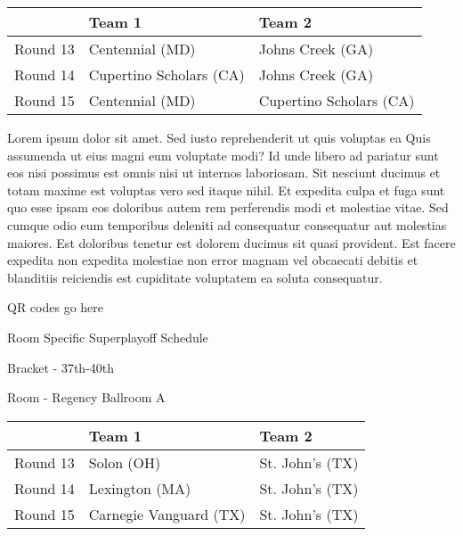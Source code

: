 \documentclass{article}%
\begin{document}
%
\begin{tabularx}{\textwidth}{|c|Y|Y|}%
\hline%
&Team 1&Team 2\\%
\hline%
Round 13&Centennial (MD)&Johns Creek (GA)\\%
Round 14&Cupertino Scholars (CA)&Johns Creek (GA)\\%
Round 15&Centennial (MD)&Cupertino Scholars (CA)\\%
\hline%
\end{tabularx}%
\vspace*{8pt}%
\newline%
Lorem ipsum dolor sit amet. Sed iusto reprehenderit ut quis voluptas ea Quis assumenda ut eius magni eum voluptate modi? Id unde libero ad pariatur sunt eos nisi possimus est omnis nisi ut internos laboriosam. Sit nesciunt ducimus et totam maxime est voluptas vero sed itaque nihil. Et expedita culpa et fuga sunt quo esse ipsam eos doloribus autem rem perferendis modi et molestiae vitae.\newline%
\newline%
Sed cumque odio eum temporibus deleniti ad consequatur consequatur aut molestias maiores. Est doloribus tenetur est dolorem ducimus sit quasi provident. Est facere expedita non expedita molestiae non error magnam vel obcaecati debitis et blanditiis reiciendis est cupiditate voluptatem ea soluta consequatur.%
\vspace*{140pt}%
\begin{center}%
\begin{Huge}%
QR codes go here%
\end{Huge}%
\end{center}%
\newpage%
\begin{center}%
\begin{Huge}%
Room Specific Superplayoff Schedule%
\end{Huge}%
\vspace*{8pt}%
\linebreak%
\begin{Large}%
Bracket {-} 37th{-}40th%
\end{Large}%
\vspace*{8pt}%
\linebreak%
\vspace*{8pt}%
\begin{Large}%
Room {-} Regency Ballroom A%
\end{Large}%
\end{center}%
%
\begin{tabularx}{\textwidth}{|c|Y|Y|}%
\hline%
&Team 1&Team 2\\%
\hline%
Round 13&Solon (OH)&St. John's (TX)\\%
Round 14&Lexington (MA)&St. John's (TX)\\%
Round 15&Carnegie Vanguard (TX)&St. John's (TX)\\%
\hline%
\end{tabularx}%
\end{document}

